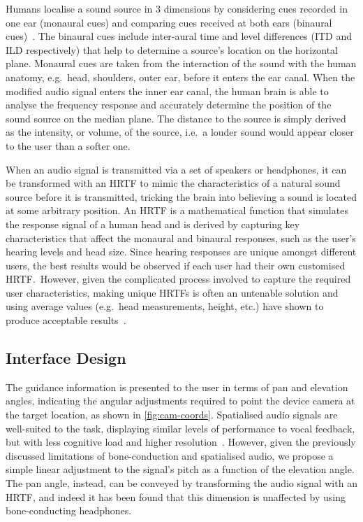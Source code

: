 \documentclass{llncs}
\begin{document}
Humans localise a sound source in 3 dimensions by considering cues recorded in one ear (monaural cues) and comparing cues received at both ears (binaural cues)~\cite{blauert1997spatial,blauert1969sound}.
The binaural cues include inter-aural time and level differences (ITD and ILD respectively) that help to determine a source's location on the horizontal plane.
Monaural cues are taken from the interaction of the sound with the human anatomy, e.g.\ head, shoulders, outer ear, before it enters the ear canal.
When the modified audio signal enters the inner ear canal, the human brain is able to analyse the frequency response and accurately determine the position of the sound source on the median plane. 
The distance to the source is simply derived as the intensity, or volume, of the source, i.e.\ a louder sound would appear closer to the user than a softer one. 

When an audio signal is transmitted via a set of speakers or headphones, it can be transformed with an HRTF to mimic the characteristics of a natural sound source before it is transmitted, tricking the brain into believing a sound is located at some arbitrary position.
An HRTF is a mathematical function that simulates the response signal of a human head and is derived by capturing key characteristics that affect the monaural and binaural responses, such as the user's hearing levels and head size.
Since hearing responses are unique amongst different users, the best results would be observed if each user had their own customised HRTF.\
However, given the complicated process involved to capture the required user characteristics, making unique HRTFs is often an untenable solution and using average values (e.g.\ head measurements, height, etc.) have shown to produce acceptable results~\cite{gardner1995hrtf}.

\subsection{Interface Design}

The guidance information is presented to the user in terms of pan and elevation angles, indicating the angular adjustments required to point the device camera at the target location, as shown in \cref{fig:cam-coords}.
Spatialised audio signals are well-suited to the task, displaying similar levels of performance to vocal feedback, but with less cognitive load and higher resolution~\cite{klatzky2006cognitive}.
However, given the previously discussed limitations of bone-conduction and spatialised audio, we propose a simple linear adjustment to the signal's pitch as a function of the elevation angle. 
The pan angle, instead, can be conveyed by transforming the audio signal with an HRTF, and indeed it has been found that this dimension is unaffected by using bone-conducting headphones\cite{schonstein2008comparison,macdonald2006spatial,stanley2006lateralization}. 
\end{document}
